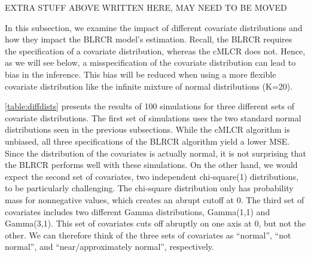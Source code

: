 \documentclass[
  12pt,
]{article}
\begin{document}
EXTRA STUFF ABOVE WRITTEN HERE, MAY NEED TO BE MOVED

In this subsection, we examine the impact of different covariate
distributions and how they impact the BLRCR model's estimation. Recall,
the BLRCR requires the specification of a covariate distribution,
whereas the cMLCR does not. Hence, as we will see below, a
misspecification of the covariate distribution can lead to bias in the
inference. This bias will be reduced when using a more flexible
covariate distribution like the infinite mixture of normal distributions
(K=20).

\autoref{table:diffdists} presents the results of 100 simulations for
three different sets of covariate distributions. The first set of
simulations uses the two standard normal distributions seen in the
previous subsections. While the cMLCR algorithm is unbiased, all three
specifications of the BLRCR algorithm yield a lower MSE. Since the
distribution of the covariates is actually normal, it is not surprising
that the BLRCR performs well with these simulations. On the other hand,
we would expect the second set of covariates, two independent
chi-square(1) distributions, to be particularly challenging. The
chi-square distribution only has probability mass for nonnegative
values, which creates an abrupt cutoff at 0. The third set of covariates
includes two different Gamma distributions, Gamma(1,1) and Gamma(3,1).
This set of covariates cuts off abruptly on one axis at 0, but not the
other. We can therefore think of the three sets of covariates as
``normal'', ``not normal'', and ``near/approximately normal'',
respectively.
\end{document}
